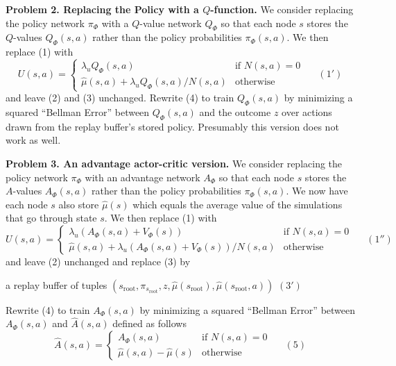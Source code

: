 \bigskip
{\bf Problem 2.  Replacing the Policy with a $Q$-function.}
We consider replacing the policy network $\pi_\Phi$ with a $Q$-value network $Q_\Phi$ so that each node $s$ stores the $Q$-values $Q_\Phi(s,a)$ rather than
the policy probabilities $\pi_\Phi(s,a)$.  We then replace (1) with
$$U(s,a) =  \left\{\begin{array}{ll}\lambda_u Q_\Phi(s,a) &\mbox{if $N(s,a) = 0$} \\ \hat{\mu}(s,a) + \lambda_u Q_\Phi(s,a)/N(s,a) & \mbox{otherwise} \end{array}\right.\;\;\;\;\;(1')$$
and leave (2) and (3) unchanged.  Rewrite (4) to train $Q_\Phi(s,a)$ by minimizing a squared ``Bellman Error'' between $Q_\Phi(s,a)$ and the outcome $z$ over actions drawn from the replay buffer's stored policy.
Presumably this version does not work as well.


\bigskip
{\bf Problem 3. An advantage actor-critic version.}
We consider replacing the policy network $\pi_\Phi$ with an advantage network $A_\Phi$ so that each node $s$ stores the $A$-values $A_\Phi(s,a)$ rather than
the policy probabilities $\pi_\Phi(s,a)$.  We now have each node $s$ also store $\hat{\mu}(s)$ which equals the average value of the simulations that go through state $s$.
We then replace (1) with
$$U(s,a) =  \left\{\begin{array}{ll}\lambda_u(A_\Phi(s,a) + V_\Phi(s)) &\mbox{if $N(s,a) = 0$} \\ \hat{\mu}(s,a) + \lambda_u(A_\Phi(s,a) + V_\Phi(s))/N(s,a) & \mbox{otherwise} \end{array}\right.\;\;\;\;\;(1'')$$
and leave (2) unchanged and replace (3) by

\medskip
\centerline{a replay buffer of tuples $(s_{\mathrm{root}},\pi_{s_{\mathrm{root}}},z,\hat{\mu}(s_{\mathrm{root}}),\hat{\mu}(s_{\mathrm{root}},a))$ \hspace{2em}$(3')$}

\medskip
Rewrite (4) to train $A_\Phi(s,a)$ by minimizing a squared ``Bellman Error'' between $A_\Phi(s,a)$ and $\hat{A}(s,a)$ defined as follows
$$\hat{A}(s,a) =  \left\{\begin{array}{ll}A_\Phi(s,a) &\mbox{if $N(s,a) = 0$} \\ \hat{\mu}(s,a) - \hat{\mu}(s) & \mbox{otherwise} \end{array}\right.\;\;\;\;\;(5)$$

